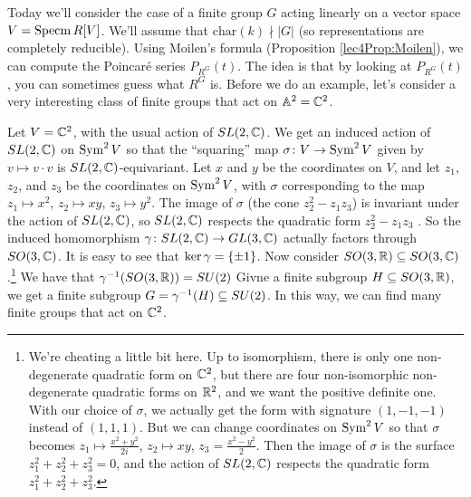 
Today we'll consider the case of a finite group $G$ acting linearly on a vector space $V = \operatorname{Specm} R[V]$. We'll assume that $\mathrm{char}(k)\nmid |G|$ (so representations are completely reducible). Using Moilen's formula (Proposition \ref{lec4Prop:Moilen}), we can compute the Poincar\'e series $P_{R^G}(t)$. The idea is that by looking at $P_{R^G}(t)$, you can sometimes guess what $R^G$ is. Before we do an example, let's consider a very interesting class of finite groups that act on $\mathbb{A}^2=\mathbb{C}^2$.

 Let $V=\mathbb{C}^2$, with the usual action of $SL(2,\mathbb{C})$. We get an induced action of $SL(2,\mathbb{C})$ on $\operatorname{Sym}^2 V$ so that the ``squaring'' map $\sigma\colon V\to \operatorname{Sym}^2 V$ given by $v\mapsto v\cdot v$ is $SL(2,\mathbb{C})$-equivariant. Let $x$ and $y$ be the coordinates on $V$, and let $z_1$, $z_2$, and $z_3$ be the coordinates on $\operatorname{Sym}^2 V$, with $\sigma$ corresponding to the map $z_1\mapsto x^2$, $z_2\mapsto xy$, $z_3\mapsto y^2$. The image of $\sigma$ (the cone $z_2^2-z_1z_3$) is invariant under the action of $SL(2,\mathbb{C})$, so $SL(2,\mathbb{C})$ respects the quadratic form $z_2^2-z_1z_3$ . So the induced homomorphism $\gamma\colon SL(2,\mathbb{C})\to GL(3,\mathbb{C})$ actually factors through $SO(3,\mathbb{C})$. It is easy to see that $\ker \gamma = \{\pm 1\}$. Now consider $SO(3,\mathbb{R})\subseteq SO(3,\mathbb{C})$.\footnote{We're cheating a little bit here. Up to isomorphism, there is only one non-degenerate quadratic form on $\mathbb{C}^2$, but there are four non-isomorphic non-degenerate quadratic forms on $\mathbb{R}^2$, and we want the positive definite one. With our choice of $\sigma$, we actually get the form with signature $(1,-1,-1)$ instead of $(1,1,1)$. But we can change coordinates on $\operatorname{Sym}^2 V$ so that $\sigma$ becomes $z_1\mapsto \frac{x^2+y^2}{2i}$, $z_2\mapsto xy$, $z_3=\frac{x^2-y^2}{2}$. Then the image of $\sigma$ is the surface $z_1^2+z_2^2+z_3^2=0$, and the action of $SL(2,\mathbb{C})$ respects the quadratic form $z_1^2+z_2^2+z_3^2$.} We have that $\gamma^{-1}(SO(3,\mathbb{R}))=SU(2)$  Givne a finite subgroup $H\subseteq SO(3,\mathbb{R})$, we get a finite subgroup $G=\gamma^{-1}(H)\subseteq SU(2)$. In this way, we can find many finite groups that act on $\mathbb{C}^2$.


